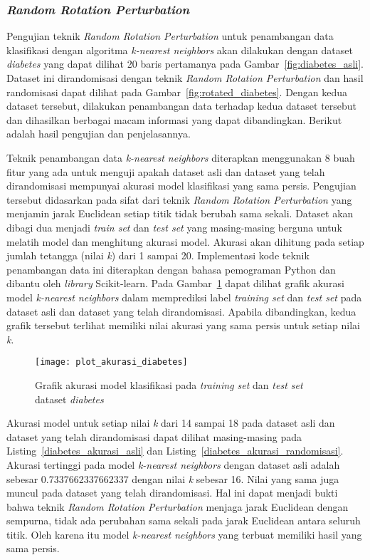 \subsubsection{\textit{Random Rotation Perturbation}}
\label{subsubsec:pengujian-klasifikasi-rrp}

Pengujian teknik \textit{Random Rotation Perturbation} untuk penambangan data klasifikasi dengan algoritma \textit{k-nearest neighbors} akan dilakukan dengan dataset \textit{diabetes} yang dapat dilihat 20 baris pertamanya pada Gambar~\ref{fig:diabetes_asli}. Dataset ini dirandomisasi dengan teknik \textit{Random Rotation Perturbation} dan hasil randomisasi dapat dilihat pada Gambar~\ref{fig:rotated_diabetes}. Dengan kedua dataset tersebut, dilakukan penambangan data terhadap kedua dataset tersebut dan dihasilkan berbagai macam informasi yang dapat dibandingkan. Berikut adalah hasil pengujian dan penjelasannya.

Teknik penambangan data \textit{k-nearest neighbors} diterapkan menggunakan 8 buah fitur yang ada untuk menguji apakah dataset asli dan dataset yang telah dirandomisasi mempunyai akurasi model klasifikasi yang sama persis. Pengujian tersebut didasarkan pada sifat dari teknik \textit{Random Rotation Perturbation} yang menjamin jarak Euclidean setiap titik tidak berubah sama sekali. Dataset akan dibagi dua menjadi \textit{train set} dan \textit{test set} yang masing-masing berguna untuk melatih model dan menghitung akurasi model. Akurasi akan dihitung pada setiap jumlah tetangga (nilai \textit{k}) dari 1 sampai 20. Implementasi kode teknik penambangan data ini diterapkan dengan bahasa pemograman Python dan dibantu oleh \textit{library} Scikit-learn. Pada Gambar~\ref{fig:plot_akurasi_diabetes} dapat dilihat grafik akurasi model \textit{k-nearest neighbors} dalam memprediksi label \textit{training set} dan \textit{test set} pada dataset asli dan dataset yang telah dirandomisasi. Apabila dibandingkan, kedua grafik tersebut terlihat memiliki nilai akurasi yang sama persis untuk setiap nilai \textit{k}. 

\begin{figure}
	\centering
	\texttt{[image: plot\_akurasi\_diabetes]}
	\caption{Grafik akurasi model klasifikasi pada \textit{training set} dan \textit{test set} dataset \textit{diabetes}}
	\label{fig:plot_akurasi_diabetes}
\end{figure}

Akurasi model untuk setiap nilai \textit{k} dari 14 sampai 18 pada dataset asli dan dataset yang telah dirandomisasi dapat dilihat masing-masing pada Listing~\ref{diabetes_akurasi_asli} dan Listing~\ref{diabetes_akurasi_randomisasi}. Akurasi tertinggi pada model \textit{k-nearest neighbors} dengan dataset asli adalah sebesar 0.7337662337662337 dengan nilai \textit{k} sebesar 16. Nilai yang sama juga muncul pada dataset yang telah dirandomisasi. Hal ini dapat menjadi bukti bahwa teknik \textit{Random Rotation Perturbation} menjaga jarak Euclidean dengan sempurna, tidak ada perubahan sama sekali pada jarak Euclidean antara seluruh titik. Oleh karena itu model \textit{k-nearest neighbors} yang terbuat memiliki hasil yang sama persis.

